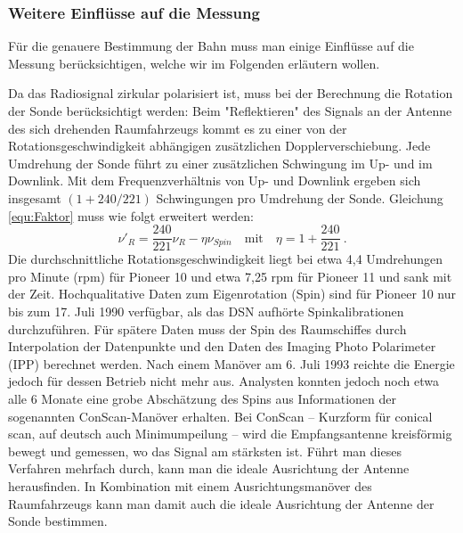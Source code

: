 \subsubsection{Weitere Einflüsse auf die Messung}
Für die genauere Bestimmung der Bahn muss man einige Einflüsse auf die Messung berücksichtigen, welche wir im Folgenden erläutern wollen.

Da das Radiosignal zirkular polarisiert ist, muss bei der Berechnung die Rotation der Sonde berücksichtigt werden: Beim "Reflektieren" des Signals an der Antenne des sich drehenden Raumfahrzeugs kommt es zu einer von der Rotationsgeschwindigkeit abhängigen zusätzlichen Dopplerverschiebung. Jede Umdrehung der Sonde führt zu einer zusätzlichen Schwingung im Up- und im Downlink. Mit dem Frequenzverhältnis von Up- und Downlink ergeben sich insgesamt $(1+240/221)$ Schwingungen pro Umdrehung der Sonde\cite{Anderson2002}. %
Gleichung \ref{equ:Faktor} muss wie folgt erweitert werden:
\begin{equation}
\nu'_R = \frac{240}{221}\nu_R - \eta\nu_{Spin} \quad \mathrm{mit}  \quad \eta = 1+ \frac{240}{221}\ .
\end{equation}
Die durchschnittliche Rotationsgeschwindigkeit liegt bei etwa 4,4 Umdrehungen pro Minute (rpm) für Pioneer 10 und etwa 7,25 rpm für Pioneer 11 und sank mit der Zeit\cite{Anderson2002}.
Hochqualitative Daten zum Eigenrotation (Spin) sind für Pioneer 10 nur bis zum 17. Juli 1990 verfügbar, als das DSN aufhörte Spinkalibrationen durchzuführen. Für spätere Daten muss der Spin des Raumschiffes durch Interpolation der Datenpunkte und den Daten des Imaging Photo Polarimeter (IPP) berechnet werden. Nach einem Manöver am 6. Juli 1993 reichte die Energie jedoch für dessen Betrieb nicht mehr aus. Analysten konnten jedoch noch etwa alle 6 Monate eine grobe Abschätzung des Spins aus Informationen der sogenannten ConScan-Manöver erhalten. %
Bei ConScan – Kurzform für conical scan, auf deutsch auch Minimumpeilung – wird die Empfangsantenne kreisförmig bewegt und gemessen, wo das Signal am stärksten ist. Führt man dieses Verfahren mehrfach durch, kann man die ideale Ausrichtung der Antenne herausfinden. In Kombination mit einem Ausrichtungsmanöver des Raumfahrzeugs kann man damit auch die ideale Ausrichtung der Antenne der Sonde bestimmen.\cite{Anderson2002}
